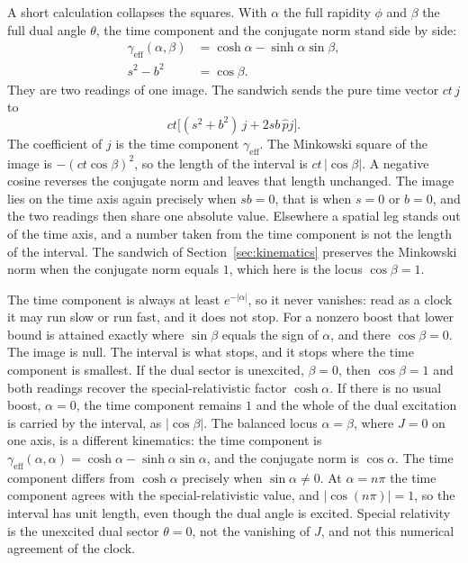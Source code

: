 \documentclass[a4paper]{article}
\begin{document}
A short calculation collapses the squares. With $\alpha$ the full rapidity $\phi$ and $\beta$ the full dual angle $\theta$, the time component and the conjugate norm stand side by side:
\begin{align}
\gamma_{\mathrm{eff}}(\alpha,\beta)&=\cosh\alpha-\sinh\alpha\sin\beta,
\label{eq:gamma-eff}\\
s^{2}-b^{2}&=\cos\beta.
\label{eq:gamma-cos}
\end{align}
They are two readings of one image. The sandwich sends the pure time vector $ct\,j$ to
\[
ct\bigl[(s^{2}+b^{2})\,j+2sb\,\hat{p}j\bigr].
\]
The coefficient of $j$ is the time component $\gamma_{\mathrm{eff}}$. The Minkowski square of the image is $-(ct\cos\beta)^{2}$, so the length of the interval is $ct\,|\cos\beta|$. A negative cosine reverses the conjugate norm and leaves that length unchanged. The image lies on the time axis again precisely when $sb=0$, that is when $s=0$ or $b=0$, and the two readings then share one absolute value. Elsewhere a spatial leg stands out of the time axis, and a number taken from the time component is not the length of the interval. The sandwich of Section~\ref{sec:kinematics} preserves the Minkowski norm when the conjugate norm equals $1$, which here is the locus $\cos\beta=1$.

The time component is always at least $e^{-|\alpha|}$, so it never vanishes: read as a clock it may run slow or run fast, and it does not stop. For a nonzero boost that lower bound is attained exactly where $\sin\beta$ equals the sign of $\alpha$, and there $\cos\beta=0$. The image is null. The interval is what stops, and it stops where the time component is smallest. If the dual sector is unexcited, $\beta=0$, then $\cos\beta=1$ and both readings recover the special-relativistic factor $\cosh\alpha$. If there is no usual boost, $\alpha=0$, the time component remains $1$ and the whole of the dual excitation is carried by the interval, as $|\cos\beta|$. The balanced locus $\alpha=\beta$, where $J=0$ on one axis, is a different kinematics: the time component is $\gamma_{\mathrm{eff}}(\alpha,\alpha)=\cosh\alpha-\sinh\alpha\sin\alpha$, and the conjugate norm is $\cos\alpha$. The time component differs from $\cosh\alpha$ precisely when $\sin\alpha\neq 0$. At $\alpha=n\pi$ the time component agrees with the special-relativistic value, and $|\cos(n\pi)|=1$, so the interval has unit length, even though the dual angle is excited. Special relativity is the unexcited dual sector $\theta=0$, not the vanishing of $J$, and not this numerical agreement of the clock.
\end{document}
